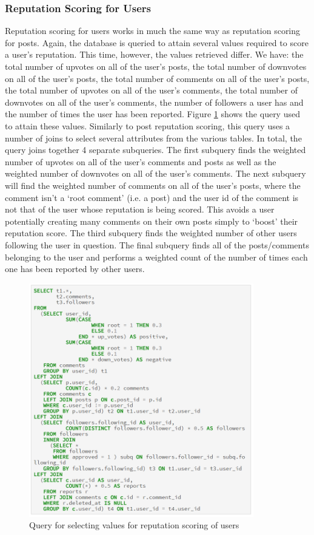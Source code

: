 \subsubsection{Reputation Scoring for Users}
Reputation scoring for users works in much the same way as reputation scoring for posts. Again, the database is queried to attain several values required to score a user's reputation. This time, however, the values retrieved differ. We have: the total number of upvotes on all of the user's posts, the total number of downvotes on all of the user's posts, the total number of comments on all of the user's posts, the total number of upvotes on all of the user's comments, the total number of downvotes on all of the user's comments, the number of followers a user has and the number of times the user has been reported. Figure \ref{fig:UserRepQuery} shows the query used to attain these values. Similarly to post reputation scoring, this query uses a number of joins to select several attributes from the various tables. In total, the query joins together 4 separate subqueries. The first subquery finds the weighted number of upvotes on all of the user's comments and posts as well as the weighted number of downvotes on all of the user's comments. The next subquery will find the weighted number of comments on all of the user's posts, where the comment isn't a `root comment' (i.e. a post) and the user id of the comment is not that of the user whose reputation is being scored. This avoids a user potentially creating many comments on their own posts simply to `boost' their reputation score. The third subquery finds the weighted number of other users following the user in question. The final subquery finds all of the posts/comments belonging to the user and performs a weighted count of the number of times each one has been reported by other users.

\begin{figure}[H]
\centering
\includegraphics[height=4in]{Images/Implementation/UserRepQuery}
\caption{Query for selecting values for reputation scoring of users}
\label{fig:UserRepQuery}
\end{figure}

